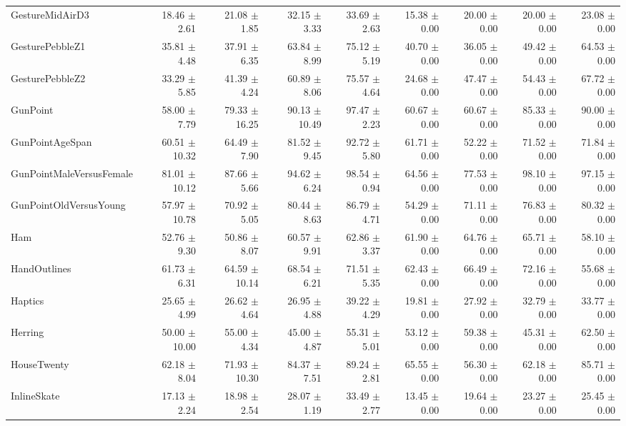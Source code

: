 \begin{landscape}
\begin{longtable}{lrrrrrrrr}
GestureMidAirD3 & 18.46 $\pm$ 2.61 & 21.08 $\pm$ 1.85 & 32.15 $\pm$ 3.33 & 33.69 $\pm$ 2.63 & 15.38 $\pm$ 0.00 & 20.00 $\pm$ 0.00 & 20.00 $\pm$ 0.00 & 23.08 $\pm$ 0.00 \\
GesturePebbleZ1 & 35.81 $\pm$ 4.48 & 37.91 $\pm$ 6.35 & 63.84 $\pm$ 8.99 & 75.12 $\pm$ 5.19 & 40.70 $\pm$ 0.00 & 36.05 $\pm$ 0.00 & 49.42 $\pm$ 0.00 & 64.53 $\pm$ 0.00 \\
GesturePebbleZ2 & 33.29 $\pm$ 5.85 & 41.39 $\pm$ 4.24 & 60.89 $\pm$ 8.06 & 75.57 $\pm$ 4.64 & 24.68 $\pm$ 0.00 & 47.47 $\pm$ 0.00 & 54.43 $\pm$ 0.00 & 67.72 $\pm$ 0.00 \\
GunPoint & 58.00 $\pm$ 7.79 & 79.33 $\pm$ 16.25 & 90.13 $\pm$ 10.49 & 97.47 $\pm$ 2.23 & 60.67 $\pm$ 0.00 & 60.67 $\pm$ 0.00 & 85.33 $\pm$ 0.00 & 90.00 $\pm$ 0.00 \\
GunPointAgeSpan & 60.51 $\pm$ 10.32 & 64.49 $\pm$ 7.90 & 81.52 $\pm$ 9.45 & 92.72 $\pm$ 5.80 & 61.71 $\pm$ 0.00 & 52.22 $\pm$ 0.00 & 71.52 $\pm$ 0.00 & 71.84 $\pm$ 0.00 \\
GunPointMaleVersusFemale & 81.01 $\pm$ 10.12 & 87.66 $\pm$ 5.66 & 94.62 $\pm$ 6.24 & 98.54 $\pm$ 0.94 & 64.56 $\pm$ 0.00 & 77.53 $\pm$ 0.00 & 98.10 $\pm$ 0.00 & 97.15 $\pm$ 0.00 \\
GunPointOldVersusYoung & 57.97 $\pm$ 10.78 & 70.92 $\pm$ 5.05 & 80.44 $\pm$ 8.63 & 86.79 $\pm$ 4.71 & 54.29 $\pm$ 0.00 & 71.11 $\pm$ 0.00 & 76.83 $\pm$ 0.00 & 80.32 $\pm$ 0.00 \\
Ham & 52.76 $\pm$ 9.30 & 50.86 $\pm$ 8.07 & 60.57 $\pm$ 9.91 & 62.86 $\pm$ 3.37 & 61.90 $\pm$ 0.00 & 64.76 $\pm$ 0.00 & 65.71 $\pm$ 0.00 & 58.10 $\pm$ 0.00 \\
HandOutlines & 61.73 $\pm$ 6.31 & 64.59 $\pm$ 10.14 & 68.54 $\pm$ 6.21 & 71.51 $\pm$ 5.35 & 62.43 $\pm$ 0.00 & 66.49 $\pm$ 0.00 & 72.16 $\pm$ 0.00 & 55.68 $\pm$ 0.00 \\
Haptics & 25.65 $\pm$ 4.99 & 26.62 $\pm$ 4.64 & 26.95 $\pm$ 4.88 & 39.22 $\pm$ 4.29 & 19.81 $\pm$ 0.00 & 27.92 $\pm$ 0.00 & 32.79 $\pm$ 0.00 & 33.77 $\pm$ 0.00 \\
Herring & 50.00 $\pm$ 10.00 & 55.00 $\pm$ 4.34 & 45.00 $\pm$ 4.87 & 55.31 $\pm$ 5.01 & 53.12 $\pm$ 0.00 & 59.38 $\pm$ 0.00 & 45.31 $\pm$ 0.00 & 62.50 $\pm$ 0.00 \\
HouseTwenty & 62.18 $\pm$ 8.04 & 71.93 $\pm$ 10.30 & 84.37 $\pm$ 7.51 & 89.24 $\pm$ 2.81 & 65.55 $\pm$ 0.00 & 56.30 $\pm$ 0.00 & 62.18 $\pm$ 0.00 & 85.71 $\pm$ 0.00 \\
InlineSkate & 17.13 $\pm$ 2.24 & 18.98 $\pm$ 2.54 & 28.07 $\pm$ 1.19 & 33.49 $\pm$ 2.77 & 13.45 $\pm$ 0.00 & 19.64 $\pm$ 0.00 & 23.27 $\pm$ 0.00 & 25.45 $\pm$ 0.00 \\

\end{longtable}
\end{landscape}

